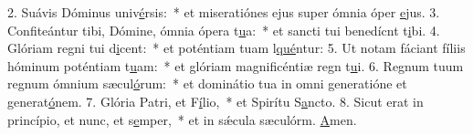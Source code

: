 2. Suávis Dóminus univ\uline{é}rsis:~* et miseratiónes ejus super ómnia óper \uline{e}jus.
3. Confiteántur tibi, Dómine, ómnia ópera t\uline{u}a:~* et sancti tui benedícnt t\uline{i}bi.
4. Glóriam regni tui d\uline{i}cent:~* et poténtiam tuam l\uline{qué}ntur:
5. Ut notam fáciant fíliis hóminum poténtiam t\uline{u}am:~* et glóriam magnificéntiæ regn t\uline{u}i.
6. Regnum tuum regnum ómnium sæcul\uline{ó}rum:~* et dominátio tua in omni generatióne et generat\uline{ó}nem.
7. Glória Patri, et F\uline{í}lio,~* et Spirítu S\uline{a}ncto.
8. Sicut erat in princípio, et nunc, et s\uline{e}mper,~* et in sǽcula sæculórm. \uline{A}men.
